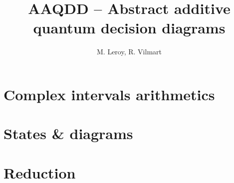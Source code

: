 \documentclass[a4paper]{report}
\title{AAQDD -- Abstract additive quantum decision diagrams}
\author{M. Leroy, R. Vilmart}
\theoremstyle{break}
\begin{document}
\maketitle

\tableofcontents

\newpage

\chapter{Complex intervals arithmetics}



\chapter{States \& diagrams}



\chapter{Reduction}


\end{document}
